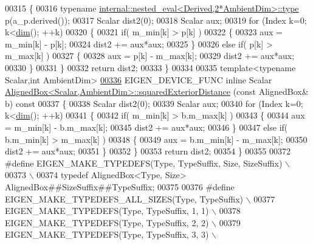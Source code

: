 \begin{DoxyCode}
00315 \textcolor{keyword}{}\{
00316   \textcolor{keyword}{typename} \hyperlink{class_eigen_1_1internal_1_1_tensor_lazy_evaluator_writable}{internal::nested\_eval<Derived,2*AmbientDim>::type}
       p(a\_p.derived());
00317   Scalar dist2(0);
00318   Scalar aux;
00319   \textcolor{keywordflow}{for} (Index k=0; k<\hyperlink{group___geometry___module_ab774df3608d0be913a3aa5d67476a521}{dim}(); ++k)
00320   \{
00321     \textcolor{keywordflow}{if}( m\_min[k] > p[k] )
00322     \{
00323       aux = m\_min[k] - p[k];
00324       dist2 += aux*aux;
00325     \}
00326     \textcolor{keywordflow}{else} \textcolor{keywordflow}{if}( p[k] > m\_max[k] )
00327     \{
00328       aux = p[k] - m\_max[k];
00329       dist2 += aux*aux;
00330     \}
00331   \}
00332   \textcolor{keywordflow}{return} dist2;
00333 \}
00334 
00335 \textcolor{keyword}{template}<\textcolor{keyword}{typename} Scalar,\textcolor{keywordtype}{int} AmbientDim>
\hyperlink{group___geometry___module_ae9a0ba701f64f431ccfa63e79062a901}{00336} EIGEN\_DEVICE\_FUNC \textcolor{keyword}{inline} Scalar 
      \hyperlink{group___geometry___module_aa6d9ffc81bd77da631fef6559f45cf13}{AlignedBox<Scalar,AmbientDim>::squaredExteriorDistance}
      (\textcolor{keyword}{const} AlignedBox& b)\textcolor{keyword}{ const}
00337 \textcolor{keyword}{}\{
00338   Scalar dist2(0);
00339   Scalar aux;
00340   \textcolor{keywordflow}{for} (Index k=0; k<\hyperlink{group___geometry___module_ab774df3608d0be913a3aa5d67476a521}{dim}(); ++k)
00341   \{
00342     \textcolor{keywordflow}{if}( m\_min[k] > b.m\_max[k] )
00343     \{
00344       aux = m\_min[k] - b.m\_max[k];
00345       dist2 += aux*aux;
00346     \}
00347     \textcolor{keywordflow}{else} \textcolor{keywordflow}{if}( b.m\_min[k] > m\_max[k] )
00348     \{
00349       aux = b.m\_min[k] - m\_max[k];
00350       dist2 += aux*aux;
00351     \}
00352   \}
00353   \textcolor{keywordflow}{return} dist2;
00354 \}
00355 
00372 \textcolor{preprocessor}{#define EIGEN\_MAKE\_TYPEDEFS(Type, TypeSuffix, Size, SizeSuffix)    \(\backslash\)}
00373 \textcolor{preprocessor}{                                 \(\backslash\)}
00374 \textcolor{preprocessor}{typedef AlignedBox<Type, Size>   AlignedBox##SizeSuffix##TypeSuffix;}
00375 
00376 \textcolor{preprocessor}{#define EIGEN\_MAKE\_TYPEDEFS\_ALL\_SIZES(Type, TypeSuffix) \(\backslash\)}
00377 \textcolor{preprocessor}{EIGEN\_MAKE\_TYPEDEFS(Type, TypeSuffix, 1, 1) \(\backslash\)}
00378 \textcolor{preprocessor}{EIGEN\_MAKE\_TYPEDEFS(Type, TypeSuffix, 2, 2) \(\backslash\)}
00379 \textcolor{preprocessor}{EIGEN\_MAKE\_TYPEDEFS(Type, TypeSuffix, 3, 3) \(\backslash\)}

\end{DoxyCode}
